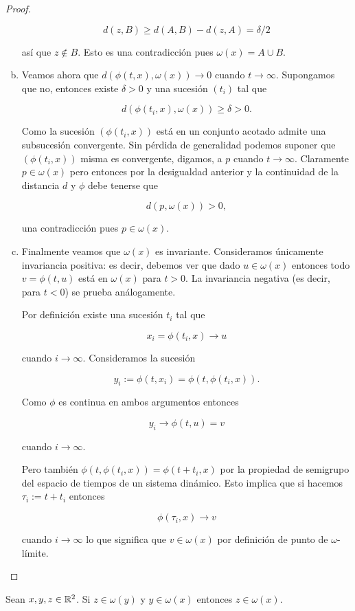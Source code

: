 \begin{proof}
\begin{enumerate}[(a)]
$$ d(z,B) \geq d(A,B) - d(z,A) = \delta/2$$

así que $z \notin B$. Esto es una contradicción pues $\omega(x) = A \cup B$.

\item Veamos ahora que $d(\phi(t,x), \omega(x)) \to 0$ cuando $t \to \infty$. Supongamos que no, entonces existe $\delta > 0$ y una sucesión $(t_i)$ tal que 

$$ d(\phi(t_i, x), \omega(x)) \geq \delta > 0.$$

Como la sucesión $(\phi(t_i, x))$ está en un conjunto acotado admite una subsucesión convergente. Sin pérdida de generalidad podemos suponer que $(\phi(t_i, x))$ misma es convergente, digamos, a $p$ cuando $t \to \infty$. Claramente $p \in \omega(x)$ pero entonces por la desigualdad anterior y la continuidad de la distancia $d$ y $\phi$ debe tenerse que

$$ d(p, \omega(x)) > 0,$$

una contradicción pues $p \in \omega(x)$.

\item Finalmente veamos que $\omega(x)$ es invariante. Consideramos únicamente invariancia positiva: es decir, debemos ver que dado $u \in \omega(x)$ entonces todo $v = \phi(t, u)$ está en $\omega(x)$ para $t > 0$. La invariancia negativa (es decir, para $t < 0$) se prueba análogamente.

Por definición existe una sucesión $t_i$ tal que

$$ x_i = \phi(t_i, x) \to u$$

cuando $i \to \infty$. Consideramos la sucesión

$$ y_i := \phi(t, x_i) = \phi(t, \phi(t_i, x)).$$

Como $\phi$ es continua en ambos argumentos entonces

$$ y_i \to \phi(t, u) = v$$

cuando $i \to \infty$.

Pero también $ \phi(t, \phi(t_i, x)) = \phi(t + t_i, x) $ por la propiedad de semigrupo del espacio de tiempos de un sistema dinámico. Esto implica que si hacemos $\tau_i := t + t_i$ entonces

$$ \phi(\tau_i, x) \to v$$

cuando $i \to \infty$ lo que significa que $v \in \omega(x)$ por definición de punto de $\omega$-límite.
\end{enumerate}
\end{proof}

\begin{corollary}[Transitividad] Sean $x,y,z \in {\ensuremath{\mathbb{R}}}^2$. Si $z \in \omega(y)$ y $y \in \omega(x)$ entonces $z \in \omega(x)$.
\end{corollary}

